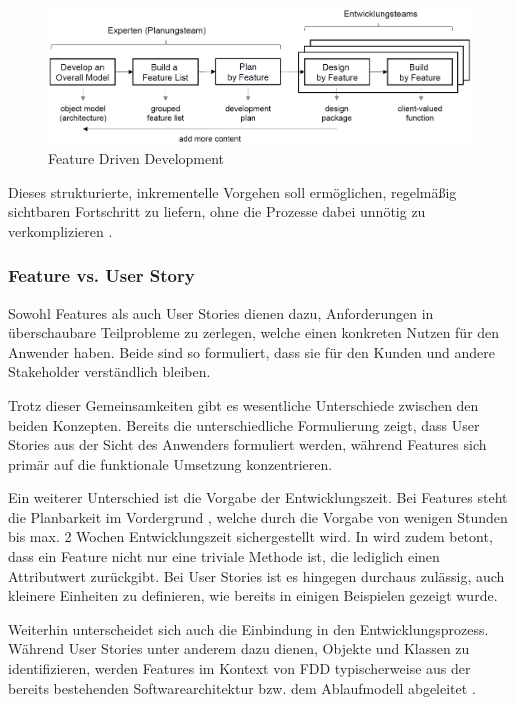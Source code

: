 \documentclass[acmtog]{acmart}
\begin{document}
\begin{figure}[t]
	\centering
	\includegraphics[width=\linewidth]{images/fdd.png}
	\caption{Feature Driven Development}
	\label{fig:fdd}
	\Description{}
\end{figure}

Dieses strukturierte, inkrementelle Vorgehen soll ermöglichen, regelmäßig sichtbaren Fortschritt zu liefern, ohne die Prozesse dabei unnötig zu verkomplizieren \cite{hunt06}.

\subsubsection{Feature vs. User Story}

Sowohl Features als auch User Stories dienen dazu, Anforderungen in überschaubare Teilprobleme zu zerlegen, welche einen konkreten Nutzen für den Anwender haben. Beide sind so formuliert, dass sie für den Kunden und andere Stakeholder verständlich bleiben.

Trotz dieser Gemeinsamkeiten gibt es wesentliche Unterschiede zwischen den beiden Konzepten.
Bereits die unterschiedliche Formulierung zeigt, dass User Stories aus der Sicht des Anwenders formuliert werden, während Features sich primär auf die funktionale Umsetzung konzentrieren.

Ein weiterer Unterschied ist die Vorgabe der Entwicklungszeit.
Bei Features steht die Planbarkeit im Vordergrund \cite{hunt06}, welche durch die Vorgabe von wenigen Stunden bis max. 2 Wochen Entwicklungszeit sichergestellt wird.
In \cite{palmer02} wird zudem betont, dass ein Feature nicht nur eine triviale Methode ist, die lediglich einen Attributwert zurückgibt.
Bei User Stories ist es hingegen durchaus zulässig, auch kleinere Einheiten zu definieren, wie bereits in einigen Beispielen gezeigt wurde.

Weiterhin unterscheidet sich auch die Einbindung in den Entwicklungsprozess.
Während User Stories unter anderem dazu dienen, Objekte und Klassen zu identifizieren, werden Features im Kontext von FDD typischerweise aus der bereits bestehenden Softwarearchitektur bzw. dem Ablaufmodell abgeleitet \cite{palmer02}.
\end{document}
